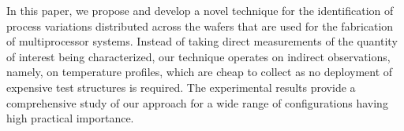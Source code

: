 In this paper, we propose and develop a novel technique for the identification of process variations distributed across the wafers that are used for the fabrication of multiprocessor systems. Instead of taking direct measurements of the quantity of interest being characterized, our technique operates on indirect observations, namely, on temperature profiles, which are cheap to collect as no deployment of expensive test structures is required.
The experimental results provide a comprehensive study of our approach for a wide range of configurations having high practical importance.

